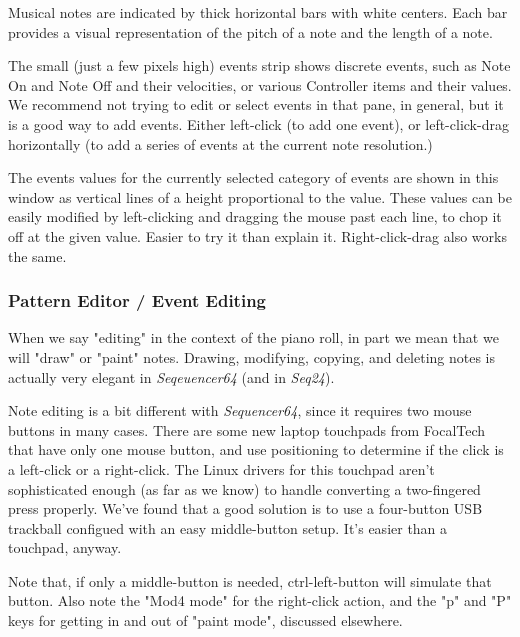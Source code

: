    Musical notes are indicated by thick horizontal bars with white
   centers.  Each bar provides
   a visual representation of the pitch of a note and the length of a note.

   The small (just a few pixels high) events strip shows discrete events,
   such as Note On and Note Off and their velocities, or various Controller
   items and their values.  We recommend not trying to edit or select events
   in that pane, in general, but it is a good way to add events.  Either
   left-click (to add one event), or left-click-drag horizontally (to add a
   series of events at the current note resolution.)

   The events values for the currently selected category of events are shown
   in this window as vertical lines of a height proportional to the value.
   These values can be easily modified by left-clicking and dragging the
   mouse past each line, to chop it off at the given value.  Easier to try
   it than explain it.  Right-click-drag also works the same.

\subsubsection{Pattern Editor / Event Editing}
\label{subsubsec:seq64_pattern_editor_event_editing}

   When we say "editing" in the context of the piano roll, in part we mean that
   we will "draw" or "paint" notes.
   Drawing, modifying, copying, and deleting
   notes is actually very elegant in \textsl{Seqeuencer64} (and in
   \textsl{Seq24}).

   Note editing is a bit different with \textsl{Sequencer64}, since it
   requires two mouse buttons in many cases.  There are some new
   laptop touchpads from FocalTech that have only one mouse button, and
   use positioning to determine if the click is a left-click or a right-click.
   The Linux drivers for this touchpad aren't sophisticated enough (as far
   as we know) to handle converting a two-fingered press properly.
   We've found that a good solution is to use a four-button USB trackball
   configued with an easy middle-button setup.
   It's easier than a touchpad, anyway.

   Note that, if only a middle-button is needed, ctrl-left-button will simulate
   that button.  Also note the "Mod4 mode" for the right-click action, and the
   "p" and "P" keys for getting in and out of "paint mode", discussed
   elsewhere.

